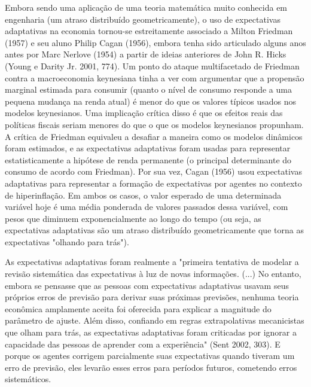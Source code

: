 \documentclass[12pt]{article}
\begin{document}
Embora sendo uma aplicação de uma teoria matemática muito conhecida em engenharia (um atraso distribuído geometricamente), o uso de expectativas adaptativas na economia tornou-se estreitamente associado a Milton Friedman (1957) e seu aluno Philip Cagan (1956), embora tenha sido articulado alguns anos antes por Marc Nerlove (1954) a partir de ideias anteriores de John R. Hicks (Young e Darity Jr. 2001, 774). Um ponto do ataque multifacetado de Friedman contra a macroeconomia keynesiana tinha a ver com argumentar que a propensão marginal estimada para consumir (quanto o nível de consumo responde a uma pequena mudança na renda atual) é menor do que os valores típicos usados nos modelos keynesianos. Uma implicação crítica disso é que os efeitos reais das políticas fiscais seriam menores do que o que os modelos keynesianos propunham. A crítica de Friedman equivaleu a desafiar a maneira como os modelos dinâmicos foram estimados, e as expectativas adaptativas foram usadas para representar estatisticamente a hipótese de renda permanente (o principal determinante do consumo de acordo com Friedman). Por sua vez, Cagan (1956) usou expectativas adaptativas para representar a formação de expectativas por agentes no contexto de hiperinflação. Em ambos os casos, o valor esperado de uma determinada variável hoje é uma média ponderada de valores passados dessa variável, com pesos que diminuem exponencialmente ao longo do tempo (ou seja, as expectativas adaptativas são um atraso distribuído geometricamente que torna as expectativas "olhando para trás").

As expectativas adaptativas foram realmente a "primeira tentativa de modelar a revisão sistemática das expectativas à luz de novas informações. (...) No entanto, embora se pensasse que as pessoas com expectativas adaptativas usavam seus próprios erros de previsão para derivar suas próximas previsões, nenhuma teoria econômica amplamente aceita foi oferecida para explicar a magnitude do parâmetro de ajuste. Além disso, confiando em regras extrapolativas mecanicistas que olham para trás, as expectativas adaptativas foram criticadas por ignorar a capacidade das pessoas de aprender com a experiência" (Sent 2002, 303). E porque os agentes corrigem parcialmente suas expectativas quando tiveram um erro de previsão, eles levarão esses erros para períodos futuros, cometendo erros sistemáticos.
\end{document}
